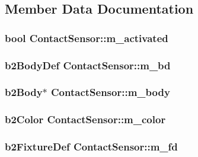\subsection{Member Data Documentation}
\hypertarget{classContactSensor_a79763d691af5d562d9039bfef94701b3}{
\subsubsection[{m\-\_\-activated}]{\setlength{\rightskip}{0pt plus 5cm}bool Contact\-Sensor\-::m\-\_\-activated}}\label{classContactSensor_a79763d691af5d562d9039bfef94701b3}
\hypertarget{classContactSensor_add4009daee3f48e71b16f6e66bdb8b32}{
\subsubsection[{m\-\_\-bd}]{\setlength{\rightskip}{0pt plus 5cm}b2\-Body\-Def Contact\-Sensor\-::m\-\_\-bd}}\label{classContactSensor_add4009daee3f48e71b16f6e66bdb8b32}
\hypertarget{classContactSensor_a654138f53967d7e8032f400d0e338bf5}{
\subsubsection[{m\-\_\-body}]{\setlength{\rightskip}{0pt plus 5cm}b2\-Body$\ast$ Contact\-Sensor\-::m\-\_\-body}}\label{classContactSensor_a654138f53967d7e8032f400d0e338bf5}
\hypertarget{classContactSensor_aad27d7430ca3e8eed90f2b8b2ad849a0}{
\subsubsection[{m\-\_\-color}]{\setlength{\rightskip}{0pt plus 5cm}b2\-Color Contact\-Sensor\-::m\-\_\-color}}\label{classContactSensor_aad27d7430ca3e8eed90f2b8b2ad849a0}
\hypertarget{classContactSensor_a1bdedd0c81bdea57ab917320dbd9b8f2}{
\subsubsection[{m\-\_\-fd}]{\setlength{\rightskip}{0pt plus 5cm}b2\-Fixture\-Def Contact\-Sensor\-::m\-\_\-fd}}\label{classContactSensor_a1bdedd0c81bdea57ab917320dbd9b8f2}
